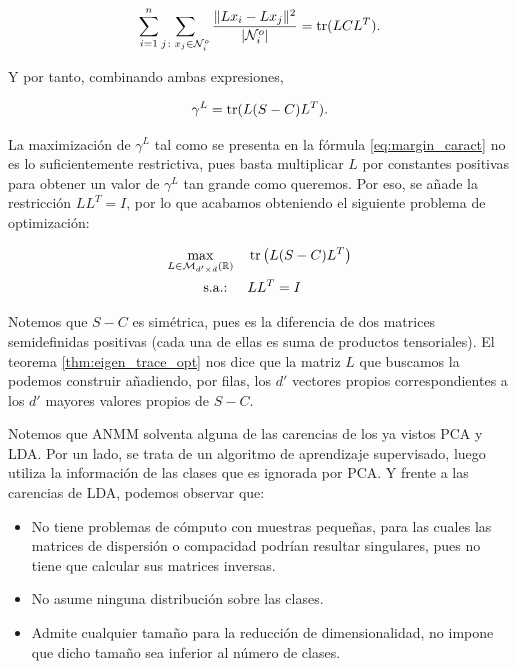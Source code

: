\documentclass{book}
\begin{document}
\begin{equation*}
	\sum_{i=1}^n\sum\limits_{j \colon x_j \in \mathcal{N}_i^o} \frac{\|Lx_i - Lx_j \|^2}{|\mathcal{N}_i^o|} = \operatorname{tr}(LCL^T).
\end{equation*}

Y por tanto, combinando ambas expresiones,

\begin{equation} \label{eq:margin_caract}
	\gamma^L = \operatorname{tr}(L(S-C)L^T).
\end{equation}

La maximización de $\gamma^L$ tal como se presenta en la fórmula \ref{eq:margin_caract} no es lo suficientemente restrictiva, pues basta multiplicar $L$ por constantes positivas para obtener un valor de $\gamma^L$ tan grande como queremos. Por eso, se añade la restricción $LL^T = I$, por lo que acabamos obteniendo el siguiente problema de optimización:

\begin{align*}
	\max_{L \in \mathcal{M}_{d'\times d}(\mathbb{R})} &\quad \operatorname{tr}\left(L(S-C)L^T\right)  \\
	\text{s.a.: } &\quad LL^T = I
\end{align*}

Notemos que $S - C$ es simétrica, pues es la diferencia de dos matrices semidefinidas positivas (cada una de ellas es suma de productos tensoriales). El teorema \ref{thm:eigen_trace_opt} nos dice que la matriz $L$ que buscamos la podemos construir añadiendo, por filas, los $d'$ vectores propios correspondientes a los $d'$ mayores valores propios de $S-C$.

Notemos que ANMM solventa alguna de las carencias de los ya vistos PCA y LDA. Por un lado, se trata de un algoritmo de aprendizaje supervisado, luego utiliza la información de las clases que es ignorada por PCA. Y frente a las carencias de LDA, podemos observar que:

\begin{itemize}
	\item No tiene problemas de cómputo con muestras pequeñas, para las cuales las matrices de dispersión o compacidad podrían resultar singulares, pues no tiene que calcular sus matrices inversas.
	\item No asume ninguna distribución sobre las clases.
	\item Admite cualquier tamaño para la reducción de dimensionalidad, no impone que dicho tamaño sea inferior al número de clases.
\end{itemize}
\end{document}
